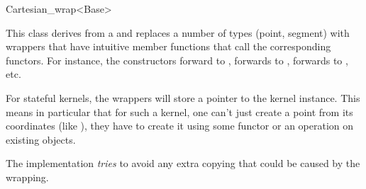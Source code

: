 \begin{ccRefClass}{Cartesian_wrap<Base>}

\ccDefinition
This class derives from a   and replaces a number
of types (point, segment) with wrappers that have intuitive member
functions that call the corresponding functors. For instance, the
constructors forward to ,
 forwards to
,
 forwards to
, etc.

For stateful kernels, the wrappers will store a pointer to the kernel
instance. This means in particular that for such a kernel, one can't
just create a point from its coordinates (like ),
they have to create it using some functor or an operation on existing
objects.

\ccIsModel
{}

\ccImplementation
The implementation \emph{tries} to avoid any extra copying that could be
caused by the wrapping.

\end{ccRefClass}
